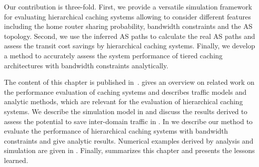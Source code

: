 Our contribution is three-fold.
First, we provide a versatile simulation framework for evaluating hierarchical caching systems allowing to consider different features including the home router sharing probability, bandwidth constraints and the AS topology.
Second, we use the inferred AS paths to calculate the real AS paths and assess the transit cost savings by hierarchical caching systems.
Finally, we develop a method to accurately assess the system performance of tiered caching architectures with bandwidth constraints analytically.



The content of this chapter is published in~\cite{lareida2015augmenting,info3-inproceedings-2015-530,info3-inproceedings-2015-514,burger2016hierarchical}.
 gives an overview on related work on the performance evaluation of caching systems and describes traffic models and analytic methods, which are relevant for the evaluation of hierarchical caching systems.
We describe the simulation model in  and discuss the results derived to assess the potential to save inter-domain traffic in .
In  we describe our method to evaluate the performance of hierarchical caching systems with bandwidth constraints and give analytic results.
Numerical examples derived by analysis and simulation are given in .
Finally,  summarizes this chapter and presents the lessons learned.




%


% 

